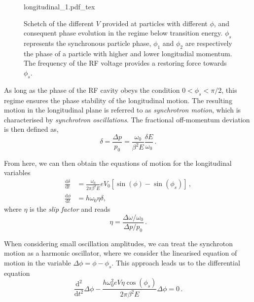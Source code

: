 \begin{figure}
    \centering
    \def\svgwidth{0.85\columnwidth}
    {longitudinal_1.pdf_tex}
    \caption{Schetch of the different $V$ provided at particles with different $\phi$, and consequent phase evolution in the regime below transition energy. $\phi_s$ represents the synchronous particle phase, $\phi_1$ and $\phi_2$ are respectively the phase of a particle with higher and lower longitudial momentum. The frequency of the RF voltage provides a restoring force towards $\phi_s$.}
    \label{fig:long_1}
\end{figure}

As long as the phase of the RF cavity obeys the condition $0<\phi_s<\pi / 2$, this regime ensures the phase stability of the longitudinal motion. The resulting motion in the longitudinal plane is referred to as \textit{synchrotron motion}, which is characterised by \textit{synchrotron oscillations}. The fractional off-momentum deviation is then defined as,
\begin{equation}
    \delta=\frac{\Delta p}{p_0}=\frac{\omega_0}{\beta^2 E} \frac{\delta E}{\omega_0} \,.
\end{equation}

From here, we can then obtain the equations of motion for the longitudinal variables
\begin{equation}
    \begin{aligned}
    \frac{\mathrm{d} \delta}{\mathrm{d} t} &=\frac{\omega_0}{2 \pi \beta^2 E} e V_0\left[\sin (\phi)-\sin \left(\phi_s\right)\right] \,, \\
    \frac{\mathrm{d} \phi}{\mathrm{d} t} &=h \omega_0 \eta \delta,
    \end{aligned}
\end{equation}
where $\eta$ is the \textit{slip factor} and reads
\begin{equation}
    \eta=\frac{\Delta \omega / \omega_0}{\Delta p / p_0} \,.
\end{equation}

When considering small oscillation amplitudes, we can treat the synchroton motion as a harmonic oscillator, where we consider the linearised equation of motion in the variable $\Delta \phi=\phi-\phi_s$. This approach leads us to the differential equation
\begin{equation}
    \frac{\mathrm{d}^2}{\mathrm{d} t^2} \Delta \phi-\frac{h \omega_0^2 e V \eta \cos \left(\phi_s\right)}{2 \pi \beta^2 E} \Delta \phi=0 \,.
\end{equation}


